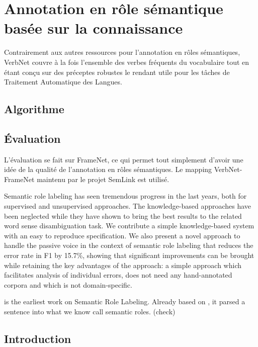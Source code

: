 \chapter{Annotation en rôle sémantique basée sur la connaissance}
\label{ch:srl}


Contrairement aux autres ressources pour l'annotation en rôles sémantiques, VerbNet couvre à la fois l'ensemble des verbes fréquents du vocabulaire tout en étant conçu sur des préceptes robustes le rendant utile pour les tâches de Traitement Automatique des Langues.

\section{Algorithme}

\section{Évaluation}

L'évaluation se fait sur FrameNet, ce qui permet tout simplement d'avoir une idée de la qualité de l'annotation en rôles sémantiques. Le mapping VerbNet-FrameNet maintenu par le projet SemLink est utilisé.


%

Semantic role labeling has seen tremendous progress in the last
years, both for supervised and unsupervised approaches. The knowledge-based
approaches have been neglected while they have shown to bring the best results
to the related word sense disambiguation task. We contribute a simple
knowledge-based system with an easy to reproduce specification. We also present
a novel approach to handle the passive voice in the context of semantic role
labeling that reduces the error rate in F1 by 15.7\%, showing that significant
improvements can be brought while retaining the key advantages of the approach:
a simple approach which facilitates analysis of individual errors, does not
need any hand-annotated corpora and which is not domain-specific.

\citep{simmons1973semantic} is the earliest work on Semantic Role Labeling.
Already based on \citep{fillmore1968case}, it parsed a sentence into what we
know call semantic roles. (check)

\section{Introduction}

